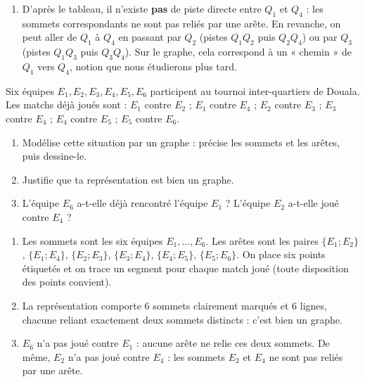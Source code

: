 \documentclass[11pt]{article}
\begin{document}
\begin{exoresolu}
\begin{enumerate}
\begin{center}
\end{center}
Justification : la représentation est constituée de \textbf{4 sommets} clairement marqués ($Q_1$, $Q_2$, $Q_3$, $Q_4$) et de \textbf{5 lignes}, chacune reliant exactement deux sommets distincts. C'est donc bien un graphe. Remarque : l'arête $Q_1Q_3$ et l'arête $Q_2Q_4$ se croisent sur le dessin, mais ce croisement n'est \textbf{pas} un sommet, car aucun point n'y est marqué.
\item D'après le tableau, il n'existe \textbf{pas} de piste directe entre $Q_1$ et $Q_4$ : les sommets correspondants ne sont pas reliés par une arête. En revanche, on peut aller de $Q_1$ à $Q_4$ en passant par $Q_2$ (pistes $Q_1Q_2$ puis $Q_2Q_4$) ou par $Q_3$ (pistes $Q_1Q_3$ puis $Q_3Q_4$). Sur le graphe, cela correspond à un « chemin » de $Q_1$ vers $Q_4$, notion que nous étudierons plus tard.
\end{enumerate}
\end{exoresolu}

\begin{exercice}
Six équipes $E_1, E_2, E_3, E_4, E_5, E_6$ participent au tournoi inter-quartiers de Douala. Les matchs déjà joués sont : $E_1$ contre $E_2$ ; $E_1$ contre $E_4$ ; $E_2$ contre $E_3$ ; $E_3$ contre $E_4$ ; $E_4$ contre $E_5$ ; $E_5$ contre $E_6$.
\begin{enumerate}
\item Modélise cette situation par un graphe : précise les sommets et les arêtes, puis dessine-le.
\item Justifie que ta représentation est bien un graphe.
\item L'équipe $E_6$ a-t-elle déjà rencontré l'équipe $E_1$ ? L'équipe $E_2$ a-t-elle joué contre $E_4$ ?
\end{enumerate}
\end{exercice}

\begin{corrige}
\begin{enumerate}
\item Les sommets sont les six équipes $E_1, \dots, E_6$. Les arêtes sont les paires $\{E_1;E_2\}$, $\{E_1;E_4\}$, $\{E_2;E_3\}$, $\{E_3;E_4\}$, $\{E_4;E_5\}$, $\{E_5;E_6\}$. On place six points étiquetés et on trace un segment pour chaque match joué (toute disposition des points convient).
\item La représentation comporte 6 sommets clairement marqués et 6 lignes, chacune reliant exactement deux sommets distincts : c'est bien un graphe.
\item $E_6$ n'a pas joué contre $E_1$ : aucune arête ne relie ces deux sommets. De même, $E_2$ n'a pas joué contre $E_4$ : les sommets $E_2$ et $E_4$ ne sont pas reliés par une arête.
\end{enumerate}
\end{corrige}
\end{document}
